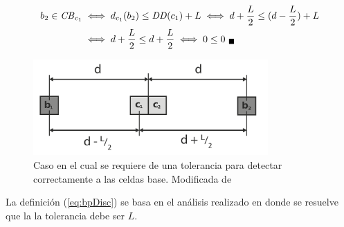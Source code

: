 \begin{align*}
\begin{split}
  b_2 \in \mathit{CB}_{c_1} & \iff  d_{c_1}(b_2) \leq \mathit{DD}(c_1) + L \iff d+\frac{L}{2} \leq (d-\frac{L}{2}) + L \\
                          & \iff   d+\frac{L}{2}  \leq d + \frac{L}{2} \iff 0  \leq 0_{\ \blacksquare}
\end{split}
\end{align*}

\begin{figure}[H]
  \centerfloat

  \includegraphics[clip=true, width=0.80\textwidth]{imagenes/basis/horizontalMod.png}

  \caption[Caso en el cual se requiere de una tolerancia para detectar correctmente a las celdas base.]{Caso en el cual se requiere de una tolerancia para detectar correctamente a las celdas base. Modificada de \cite{Liu2015}}\label{fig:bptol}

\end{figure}

La definición (\ref{eq:bpDisc}) se basa en el análisis realizado en
\cite{Liu2015} donde se resuelve que la la tolerancia debe ser $L$.

